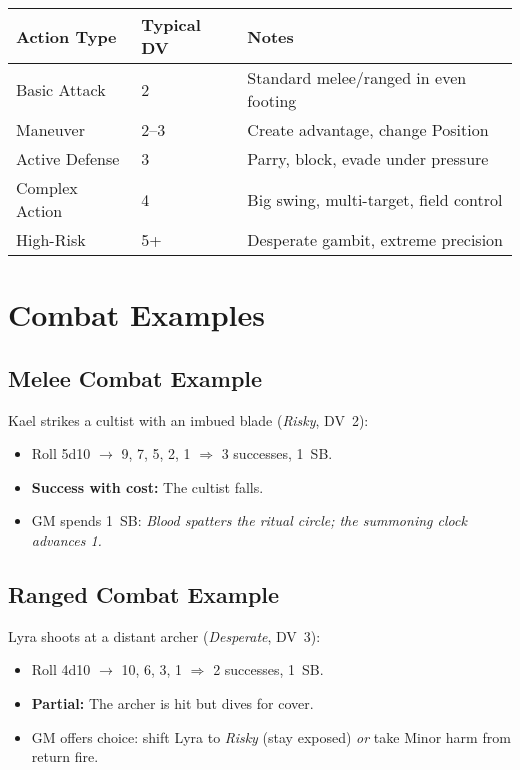 \begin{center}
\begin{tabular}{lll}
\toprule
\textbf{Action Type} & \textbf{Typical DV} & \textbf{Notes} \\
\midrule
Basic Attack    & 2   & Standard melee/ranged in even footing \\
Maneuver        & 2--3& Create advantage, change Position \\
Active Defense  & 3   & Parry, block, evade under pressure \\
Complex Action  & 4   & Big swing, multi-target, field control \\
High-Risk       & 5+  & Desperate gambit, extreme precision \\
\bottomrule
\end{tabular}
\end{center}

\section{Combat Examples}
\label{sec:combat-examples}

\subsection{Melee Combat Example}
\label{subsec:melee-example}

Kael strikes a cultist with an imbued blade (\textit{Risky}, DV~2):
\begin{itemize}
  \item Roll 5d10 $\rightarrow$ 9, 7, 5, 2, 1 $\Rightarrow$ 3 successes, 1~SB.
  \item \textbf{Success with cost:} The cultist falls.
  \item GM spends 1~SB: \emph{Blood spatters the ritual circle; the summoning clock advances 1.}
\end{itemize}

\subsection{Ranged Combat Example}
\label{subsec:ranged-example}

Lyra shoots at a distant archer (\textit{Desperate}, DV~3):
\begin{itemize}
  \item Roll 4d10 $\rightarrow$ 10, 6, 3, 1 $\Rightarrow$ 2 successes, 1~SB.
  \item \textbf{Partial:} The archer is hit but dives for cover.
  \item GM offers choice: shift Lyra to \textit{Risky} (stay exposed) \emph{or} take Minor harm from return fire.
\end{itemize}

